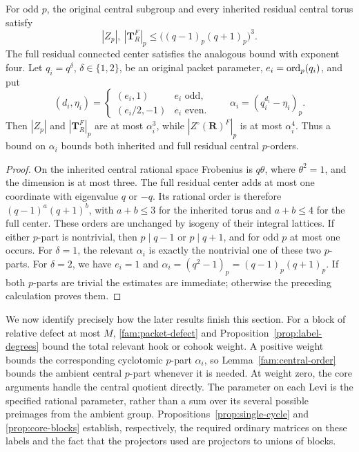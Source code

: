 \begin{lemma}\label{fam:central-order}
For odd \(p\), the original central subgroup and every inherited
residual central torus satisfy
\[
 |Z_p|,\ |\mathbf T_R^F|_p
       \leq\bigl((q-1)_p(q+1)_p\bigr)^3.
\]
The full residual connected center satisfies the analogous bound
with exponent four.  Let \(q_i=q^\delta\), \(\delta\in\{1,2\}\),
be an original packet parameter,
\(e_i=\operatorname{ord}_p(q_i)\), and put
\[
 (d_i,\eta_i)=
 \begin{cases}
  (e_i,1)&e_i\text{ odd},\\
  (e_i/2,-1)&e_i\text{ even}.
 \end{cases}
 \qquad
 \alpha_i=(q_i^{d_i}-\eta_i)_p.
\]
Then \(|Z_p|\) and \(|\mathbf T_R^F|_p\) are at most
\(\alpha_i^3\), while \(|Z^\circ(\mathbf R)^F|_p\) is at most
\(\alpha_i^4\).  Thus a bound on \(\alpha_i\) bounds both
inherited and full residual central \(p\)-orders.
\end{lemma}

\begin{proof}
On the inherited central rational space Frobenius is \(q\theta\),
where \(\theta^2=1\), and the dimension is at most three.
The full residual center adds at most one coordinate with
eigenvalue \(q\) or \(-q\).  Its rational order is therefore
\((q-1)^a(q+1)^b\), with \(a+b\leq3\) for the inherited
torus and \(a+b\leq4\) for the full center.  These orders
are unchanged by isogeny of their integral lattices.
If either \(p\)-part is nontrivial, then \(p\mid q-1\) or
\(p\mid q+1\), and for odd \(p\) at most one occurs.
For \(\delta=1\), the relevant \(\alpha_i\) is exactly the
nontrivial one of these two \(p\)-parts.  For \(\delta=2\),
we have \(e_i=1\) and
\(\alpha_i=(q^2-1)_p=(q-1)_p(q+1)_p\).
If both \(p\)-parts are trivial the estimates are immediate;
otherwise the preceding calculation proves them.
\end{proof}

We now identify precisely how the later results finish this
section.  For a block of relative defect at most \(M\),
\eqref{fam:packet-defect} and
Proposition~\ref{prop:label-degrees} bound the total relevant
hook or cohook weight.  A positive weight bounds the corresponding
cyclotomic \(p\)-part \(\alpha_i\), so
Lemma~\ref{fam:central-order} bounds the ambient central
\(p\)-part whenever it is needed.  At weight zero, the core
arguments handle the central quotient directly.  The parameter
on each Levi is the specified rational parameter, rather than
a sum over its several possible preimages from the ambient
group.  Propositions~\ref{prop:single-cycle} and
\ref{prop:core-blocks} establish, respectively, the required
ordinary matrices on these labels and the fact that the
projectors used are projectors to unions of blocks.

